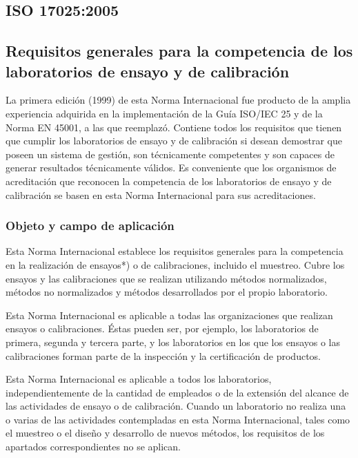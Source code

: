 \subsection{ISO 17025:2005 \cite{iso17025}}
\subsection*{Requisitos generales para la competencia de los laboratorios de ensayo y de calibración}

\par 
La primera edición (1999) de esta Norma Internacional fue producto de la amplia experiencia adquirida en la
implementación de la Guía ISO/IEC 25 y de la Norma EN 45001, a las que reemplazó. Contiene todos los
requisitos que tienen que cumplir los laboratorios de ensayo y de calibración si desean demostrar que poseen
un sistema de gestión, son técnicamente competentes y son capaces de generar resultados técnicamente
válidos. Es conveniente que los organismos de acreditación que reconocen la competencia de los laboratorios de
ensayo y de calibración se basen en esta Norma Internacional para sus acreditaciones.

\subsubsection{Objeto y campo de aplicación}
\par
Esta Norma Internacional establece los requisitos generales para la competencia en la realización de
ensayos*) o de calibraciones, incluido el muestreo. Cubre los ensayos y las calibraciones que se realizan
utilizando métodos normalizados, métodos no normalizados y métodos desarrollados por el propio laboratorio.

\par \noindent
Esta Norma Internacional es aplicable a todas las organizaciones que realizan ensayos o calibraciones.
Éstas pueden ser, por ejemplo, los laboratorios de primera, segunda y tercera parte, y los laboratorios en los que los ensayos o las calibraciones forman parte de la inspección y la certificación de productos.

\par \noindent
Esta Norma Internacional es aplicable a todos los laboratorios, independientemente de la cantidad de
empleados o de la extensión del alcance de las actividades de ensayo o de calibración. Cuando un laboratorio no realiza una o varias de las actividades contempladas en esta Norma Internacional, tales como el muestreo o el diseño y desarrollo de nuevos métodos, los requisitos de los apartados correspondientes no se aplican.

